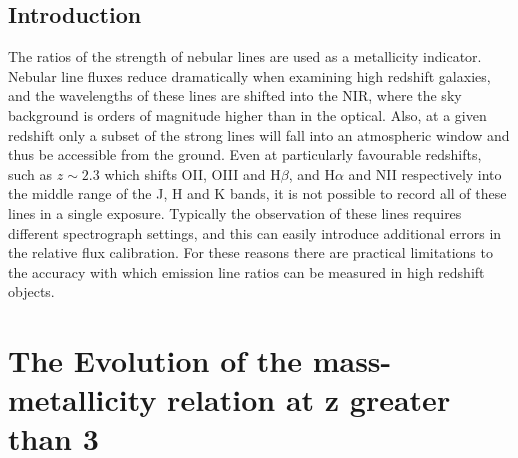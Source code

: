 \documentclass{literature}
\begin{document}
\subsection{Introduction}
The ratios of the strength of nebular lines are used as a metallicity indicator. Nebular line fluxes reduce dramatically when examining high redshift galaxies, and the wavelengths of these lines are shifted into the NIR, where the sky background is orders of magnitude higher than in the optical. Also, at a given redshift only a subset of the strong lines will fall into an atmospheric window and thus be accessible from the ground. Even at particularly favourable redshifts, such as $z\sim2.3$ which shifts OII, OIII and H$\beta$, and H$\alpha$ and NII respectively into the middle range of the J, H and K bands, it is not possible to record all of these lines in a single exposure. Typically the observation of these lines requires different spectrograph settings, and this can easily introduce additional errors in the relative flux calibration. For these reasons there are practical limitations to the accuracy with which emission line ratios can be measured in high redshift objects.   








\section{The Evolution of the mass-metallicity relation at z greater than 3}\label{sec:maiolino metallicity paper}
\end{document}
